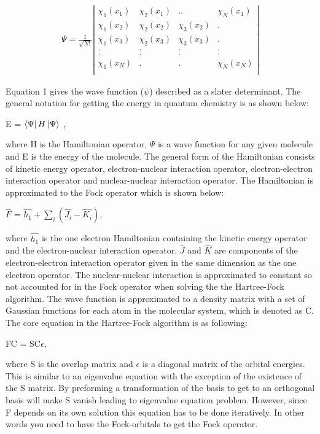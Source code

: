 \documentclass[twoside]{article}
\begin{document}
\begin{eqnarray}
\Psi=
\frac{1}{\sqrt{N!}}\left|
\begin{array}{cccc}
\chi_1(x_1)&\chi_2(x_1)&..&\chi_N(x_1)\\
\chi_1(x_2)&\chi_2(x_2)&\chi_3(x_2)&.\\
\chi_1(x_3)&\chi_2(x_3)&\chi_3(x_3)&.\\
.&.&.&.\\
.&.&.&.\\
\chi_1(x_N)&.&.&\chi_N(x_N)\\
\end{array}
\right|
\end{eqnarray}

Equation 1 gives the wave function ($\psi$) described as a slater determinant. The general notation for getting the energy in quantum chemistry is as shown below:



E = $\Bra{\Psi}H\Ket{\Psi}$ ,

where H is the Hamiltonian operator, $\Psi$ is a wave function for any given molecule and E is the energy of the molecule. The general form of the Hamiltonian consists of kinetic energy operator, electron-nuclear interaction operator, electron-electron interaction operator and nuclear-nuclear interaction operator. The Hamiltonian is approximated to the Fock operator which is shown below:


$\hat{F}$ = $\hat{h_1} + \sum\limits_{i}(\hat{J_i} - \hat{K_i})$,

where $\hat{h_1}$ is the one electron Hamiltonian containing the kinetic energy operator and the electron-nuclear interaction operator. $\hat{J}$ and $\hat{K}$ are components of the electron-electron interaction operator given in the same dimension as the one electron operator. The nuclear-nuclear interaction is approximated to constant so not accounted for in the Fock operator when solving the the Hartree-Fock algorithm. The wave function is approximated to a density matrix with a set of Gaussian functions for each atom in the molecular system, which is denoted as C. The core equation in the Hartree-Fock algorithm is as following:

FC = SC$\epsilon$,

where S is the overlap matrix and $\epsilon$ is a diagonal matrix of the orbital energies. This is similar to an eigenvalue equation with the exception of the existence of the S matrix. By preforming a transformation of the basis to get to an orthogonal basis will make S vanish leading to eigenvalue equation problem. However, since F depends on its own solution this equation has to be done iteratively. In other words you need to have the Fock-orbitals to get the Fock operator. 
\end{document}
